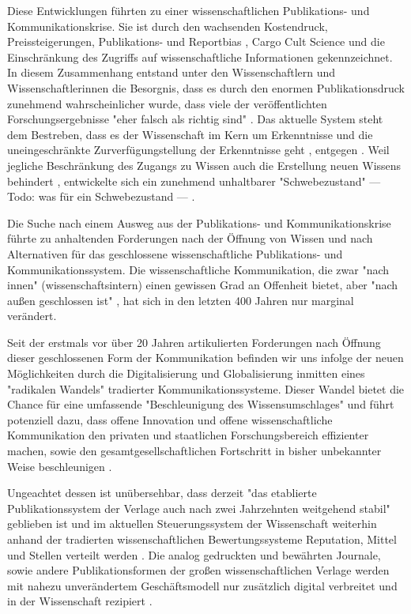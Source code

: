 Diese Entwicklungen führten zu einer wissenschaftlichen Publikations- und Kommunikationskrise. Sie ist durch den wachsenden Kostendruck, Preissteigerungen, Publikations- \cite{Egger_1997} \cite{Fanelli_2012} und Reportbias \cite{Chan_2008} \cite{Dickersin_2011}, Cargo Cult Science \cite{Feynman_1974} und die Einschränkung des Zugriffs auf wissenschaftliche Informationen \cite{Hess_2006} gekennzeichnet. In diesem Zusammenhang entstand unter den Wissenschaftlern und Wissenschaftlerinnen die Besorgnis, dass es durch den enormen Publikationsdruck zunehmend wahrscheinlicher wurde, dass viele der veröffentlichten Forschungsergebnisse "eher falsch als richtig sind" \cite{Ioannidis_2005}. Das aktuelle System steht dem Bestreben, dass es der Wissenschaft im Kern um Erkenntnisse und die uneingeschränkte Zurverfügungstellung der Erkenntnisse geht \cite{hanekop_2006}, entgegen \cite{offhaus_2012_institutionelle_repos}. Weil jegliche Beschränkung des Zugangs zu Wissen auch die Erstellung neuen Wissens behindert \cite{cite:5} \cite{cite:8} \cite{Luhmann1998}, entwickelte sich ein zunehmend unhaltbarer "Schwebezustand" --- Todo: was für ein Schwebezustand --- \cite{suchen}.

Die Suche nach einem Ausweg aus der Publikations- und Kommunikationskrise führte zu anhaltenden Forderungen nach der Öffnung von Wissen und nach Alternativen für das geschlossene wissenschaftliche Publikations- und Kommunikationssystem. Die wissenschaftliche Kommunikation, die zwar "nach innen" (wissenschaftsintern) einen gewissen Grad an Offenheit bietet, aber "nach außen geschlossen ist" \cite{kelty_2004}, hat sich in den letzten 400 Jahren nur marginal verändert.

Seit der erstmals vor über 20 Jahren artikulierten Forderungen nach Öffnung dieser geschlossenen Form der Kommunikation befinden wir uns infolge der neuen Möglichkeiten durch die Digitalisierung und Globalisierung \cite{mcluhan_1963_gutenberg} inmitten eines "radikalen Wandels" \cite{poynder_2011_suber} tradierter Kommunikationssysteme. Dieser Wandel bietet die Chance für eine umfassende "Beschleunigung des Wissensumschlages" \cite{Wenzel_2003} und führt potenziell dazu, dass offene Innovation und offene wissenschaftliche Kommunikation den privaten und staatlichen Forschungsbereich effizienter machen, sowie den gesamtgesellschaftlichen Fortschritt in bisher unbekannter Weise beschleunigen \cite{cite:7}.

Ungeachtet dessen ist unübersehbar, dass derzeit "das etablierte Publikationssystem der Verlage auch nach zwei Jahrzehnten weitgehend stabil" \cite{Hanekop_2014} geblieben ist und im aktuellen Steuerungssystem der Wissenschaft weiterhin anhand der tradierten wissenschaftlichen Bewertungssysteme Reputation, Mittel und Stellen verteilt werden \cite{cite:4}. Die analog gedruckten und bewährten Journale, sowie andere Publikationsformen der großen wissenschaftlichen Verlage werden mit nahezu unverändertem Geschäftsmodell nur zusätzlich digital verbreitet \cite{Hanekop_2014} \cite{boai_2012} und in der Wissenschaft rezipiert \cite{suchen}.

